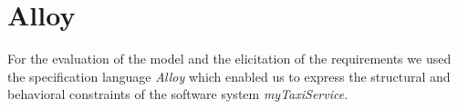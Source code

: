 \section{Alloy}
For the evaluation of the model and the elicitation of the requirements we used the specification language \textit{Alloy} which enabled us to express the structural and behavioral constraints of the software system \textit{myTaxiService}.
